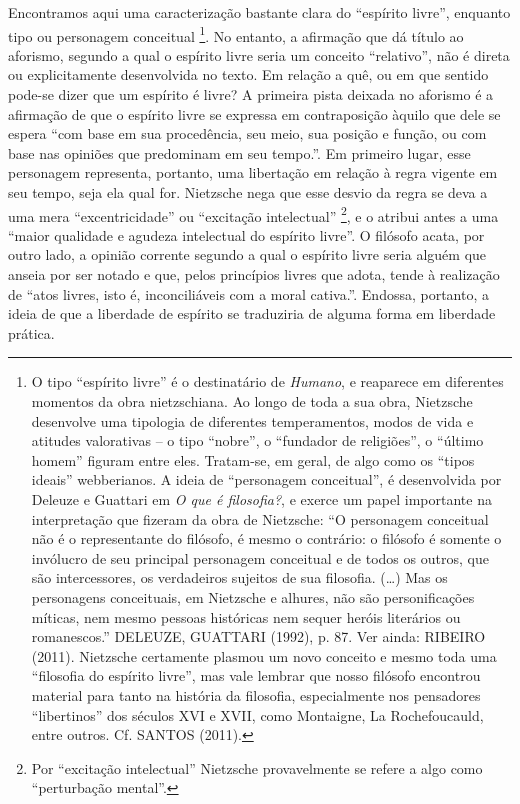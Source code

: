 \documentclass[
	12pt,				%
	openright,			%
	oneside,			%
	a4paper,			%
	english,			%
	french,				%
	spanish,			%
	brazil				%
	]{abntex2}
\begin{document}
Encontramos aqui uma caracterização bastante clara do “espírito livre”, enquanto tipo ou personagem conceitual
\footnote{O tipo “espírito livre” é o destinatário de \textit{Humano}, e reaparece em diferentes momentos da obra nietzschiana. Ao longo de toda a sua obra, Nietzsche desenvolve uma tipologia de diferentes temperamentos, modos de vida e  atitudes valorativas – o tipo “nobre”, o “fundador de religiões”, o “último homem” figuram entre eles. Tratam-se, em geral, de algo como os “tipos ideais” webberianos. A ideia de “personagem conceitual”, é desenvolvida por Deleuze e Guattari em \textit{O que é filosofia?}, e exerce um papel importante na interpretação que fizeram da obra de Nietzsche: “O personagem conceitual não é o representante do filósofo, é mesmo o contrário: o filósofo é somente o invólucro de seu principal personagem conceitual e de todos os outros, que são intercessores, os verdadeiros sujeitos de sua filosofia. (…) Mas os personagens conceituais, em Nietzsche e alhures, não são personificações míticas, nem mesmo pessoas históricas nem sequer heróis literários ou romanescos.” DELEUZE, GUATTARI (1992), p. 87. Ver ainda: RIBEIRO (2011). Nietzsche certamente plasmou um novo conceito e mesmo toda uma “filosofia do espírito livre”, mas vale lembrar que nosso filósofo encontrou material para tanto na história da filosofia, especialmente nos pensadores “libertinos” dos séculos XVI e XVII, como Montaigne, La Rochefoucauld, entre outros. Cf. SANTOS (2011).}. 
No entanto, a afirmação que dá título ao aforismo, segundo a qual o espírito livre seria um conceito “relativo”, não é direta ou explicitamente desenvolvida no texto. Em relação a quê, ou em que sentido pode-se dizer que um espírito é livre? A primeira pista deixada no aforismo é a afirmação de que o espírito livre se expressa em contraposição àquilo que dele se espera “com base em sua procedência, seu meio, sua posição e função, ou com base nas opiniões que predominam em seu tempo.”. Em primeiro lugar, esse personagem representa, portanto, uma libertação em relação à regra vigente em seu tempo, seja ela qual for. Nietzsche nega que esse desvio da regra se deva a uma mera “excentricidade” ou “excitação intelectual”
\footnote{Por “excitação intelectual” Nietzsche provavelmente se refere a algo como “perturbação mental”.}, e o atribui antes a uma “maior qualidade e agudeza intelectual do espírito livre”. O filósofo acata, por outro lado, a opinião corrente segundo a qual o espírito livre seria alguém que anseia por ser notado e que, pelos princípios livres que adota, tende à realização de “atos livres, isto é, inconciliáveis com a moral cativa.”. Endossa, portanto, a ideia de que a liberdade de espírito se traduziria de alguma forma em liberdade prática.
\end{document}
